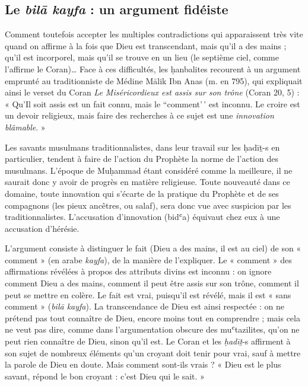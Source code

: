   
  \subsection{Le \emph{bilā kayfa} : un argument fidéiste}
  



Comment toutefois accepter les multiples contradictions qui apparaissent
très vite quand on affirme à la fois que Dieu est transcendant, mais
qu'il a des mains ; qu'il est incorporel, mais qu'il se trouve en un
lieu (le septième ciel, comme l'affirme le Coran)\ldots{} Face à ces
difficultés, les ḥanbalites recourent à un argument emprunté au
traditionniste de Médine Mālik Ibn Anas (m. en 795), qui expliquait
ainsi le verset du Coran \emph{Le Miséricordieux est assis sur son
trône} (Coran 20, 5) : « Qu'Il soit assis est un fait connu, mais le
``comment'\,' est inconnu. Le croire est un devoir religieux, mais faire
des recherches à ce sujet est une \emph{innovation blâmable}. »
\begin{Def}
 Les savants musulmans traditionnalistes, dans leur travail sur les ḥadīṯ-s en particulier, tendent à faire de l’action du Prophète la norme de l’action des musulmans. L’époque de Muḥammad étant considéré comme la meilleure, il ne saurait donc y avoir de progrès en matière religieuse. Toute nouveauté dans ce domaine, toute innovation qui s’écarte de la pratique du Prophète et de ses compagnons (les pieux ancêtres, ou salaf), sera donc vue avec suspicion par les traditionnalistes. L’accusation d’innovation (bidʿa) équivaut chez eux à une accusation d’hérésie. 
\end{Def}

L'argument consiste à distinguer le fait (Dieu a des mains, il est au
ciel) de son
« comment » (en arabe \emph{kayfa}), de la manière de l'expliquer. Le «
comment » des affirmations révélées à propos des attributs divins est
inconnu : on ignore comment Dieu a des mains, comment il peut être assis
sur son trône, comment il peut se mettre en colère. Le fait est vrai,
puisqu'il est révélé, mais il est « sans comment » (\emph{bilā kayfa}).
La transcendance de Dieu est ainsi respectée : on ne prétend pas tout
connaître de Dieu, encore moins tout en comprendre ; mais cela ne veut
pas dire, comme dans l'argumentation obscure des muʿtazilites, qu'on ne
peut rien connaître de Dieu, sinon qu'il est. Le Coran et les
\emph{ḥadīṯ}-s affirment à son sujet de nombreux éléments qu'un croyant
doit tenir pour vrai, sauf à mettre la parole de Dieu en doute. Mais
comment sont-ils vrais ? « Dieu est le plus savant, répond le bon
croyant : c'est Dieu qui le sait. »

